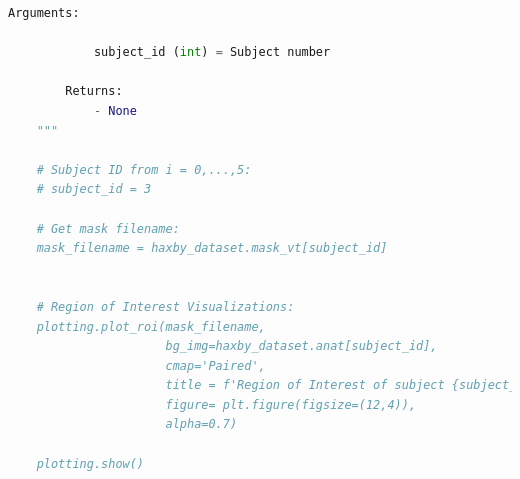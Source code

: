 \documentclass[10pt, twocolumn, letterpaper]{article}
\begin{document}
\begin{lstlisting}[language=Python]
        Arguments:
        
            subject_id (int) = Subject number 
            
        Returns:
            - None  
    """
    
    # Subject ID from i = 0,...,5:
    # subject_id = 3

    # Get mask filename:
    mask_filename = haxby_dataset.mask_vt[subject_id]


    # Region of Interest Visualizations:
    plotting.plot_roi(mask_filename,
                      bg_img=haxby_dataset.anat[subject_id],
                      cmap='Paired',
                      title = f'Region of Interest of subject {subject_id}',
                      figure= plt.figure(figsize=(12,4)),
                      alpha=0.7)

    plotting.show()
\end{lstlisting}
\end{document}
